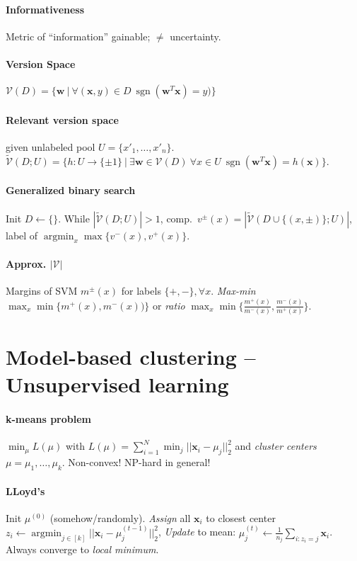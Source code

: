 \documentclass[11pt]{scrartcl}
\DeclareMathOperator{\sign}{sgn}
\DeclareMathOperator{\argmin}{argmin}
\begin{document}
\begin{multicols}{3}
\paragraph{Informativeness}
Metric of “information” gainable; $\neq$ uncertainty.
\paragraph{Version Space}
$\mathcal{V}(D) = \{\bm w\ |\ \forall(\bm x,y)\in D\ \sign(\bm w^T\bm x) = y)\}$

\paragraph{Relevant version space} given unlabeled pool $U = \{x'_1,\dots,x'_n\}$.
$\tilde{\mathcal{V}}(D;U) = \{h: U\rightarrow\{\pm 1\}\ |\ \exists\bm w \in \mathcal{V}(D)\ \forall x\in U\ \sign(\bm w^T \bm x) = h(\bm x)\}.$

\paragraph{Generalized binary search}
Init $D \leftarrow \{\}$.
While $|\tilde{\mathcal{V}}(D;U)| > 1$, comp.\ $v^\pm(x) = |\tilde{\mathcal{V}}(D \cup \{(x,\pm)\};U)|$, label of $\argmin_x \max\{v^-(x),v^+(x)\}$.

\paragraph{Approx. $|\mathcal{V}|$}
Margins of SVM $m^\pm(x)$ for labels $\{+,-\}, \forall x$. \emph{Max-min} $\max_x \min\{m^+(x),m^-(x))\}$ or \emph{ratio} $\max_x \min\{\frac{m^+(x)}{m^-(x)},\frac{m^-(x)}{m^+(x)}\}$.

\section{Model-based clustering -- Unsupervised learning}
\paragraph{k-means problem}
$\min_\mu L(\mu)$ with
$L(\mu) = \sum_{i=1}^{N}\min_j||\bm x_i-\mu_j||_2^2$ and \emph{cluster centers} $\mu = \mu_1,\dots,\mu_k$.
Non-convex! NP-hard in general!

\paragraph{LLoyd's}
Init $\mu^{(0)}$ (somehow/randomly).
\emph{Assign} all $\bm x_i$ to closest center $z_i \leftarrow \argmin_{j \in [k]} ||\bm x_i - \mu_j^{(t-1)}||_2^2$,
\emph{Update} to mean: $\mu_j^{(t)} \leftarrow \frac{1}{n_j}\sum_{i:z_i = j}\bm x_i$.
Always converge to \emph{local minimum}.


\end{multicols}
\end{document}
